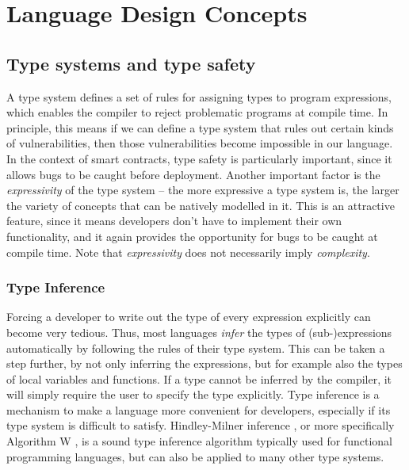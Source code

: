 \section{Language Design Concepts}

\subsection{Type systems and type safety}

A type system defines a set of rules for assigning types to program expressions, which enables the compiler to reject problematic programs at compile time. In principle, this means if we can define a type system that rules out certain kinds of vulnerabilities, then those vulnerabilities become impossible in our language. In the context of smart contracts, type safety is particularly important, since it allows bugs to be caught before deployment. Another important factor is the \textit{expressivity} of the type system -- the more expressive a type system is, the larger the variety of concepts that can be natively modelled in it. This is an attractive feature, since it means developers don't have to implement their own functionality, and it again provides the opportunity for bugs to be caught at compile time. Note that \textit{expressivity} does not necessarily imply \textit{complexity}.

\subsubsection{Type Inference}
Forcing a developer to write out the type of every expression explicitly can become very tedious. Thus, most languages \textit{infer} the types of (sub-)expressions automatically by following the rules of their type system. This can be taken a step further, by not only inferring the expressions, but for example also the types of local variables and functions. If a type cannot be inferred by the compiler, it will simply require the user to specify the type explicitly. Type inference is a mechanism to make a language more convenient for developers, especially if its type system is difficult to satisfy. Hindley-Milner inference \cite{hindley} \cite{milner}, or more specifically Algorithm W \cite{damas-milner}, is a sound type inference algorithm typically used for functional programming languages, but can also be applied to many other type systems.

